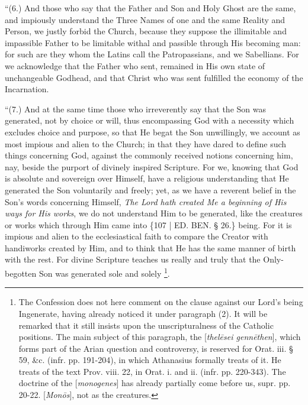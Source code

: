 ``(6.) And those who say that
the Father and Son and Holy Ghost are the same, and impiously
understand the Three Names of one and the same Reality and Person, we
justly forbid the Church, because they suppose the illimitable and
impassible Father to be limitable withal and passible through His
becoming man: for such are they whom the Latins call the Patropassians,
and we Sabellians. For we acknowledge that the Father who sent,
remained in His own state of unchangeable Godhead, and that Christ who
was sent fulfilled the economy of the Incarnation.

``(7.) And at the same time
those who irreverently say that the Son was generated, not by choice
or will, thus encompassing God with a necessity which excludes choice
and purpose, so that He begat the Son unwillingly, we account as most
impious and alien to the Church; in that they have dared to define
such things concerning God, against the commonly received notions
concerning him, nay, beside the purport of divinely inspired
Scripture. For we, knowing that God is absolute and sovereign over
Himself, have a religious understanding that He generated the Son
voluntarily and freely; yet, as we have a reverent belief in the Son's
words concerning Himself, \emph{The Lord hath created Me a beginning of
His ways for His works}, we do not understand Him to be generated,
like the creatures or works which through Him came into \{107 | ED. BEN.
§ 26.\} being. For it is impious and alien to the ecclesiastical faith
to compare the Creator with handiworks created by Him, and to think
that He has the same manner of birth with the rest. For divine
Scripture teaches us really and truly that the Only-begotten Son was
generated sole and solely \footnote{The Confession does not here comment on the clause against our Lord's
being Ingenerate, having already noticed it under paragraph (2). It
will be remarked that it still insists upon the unscripturalness of
the Catholic positions. The main subject of this paragraph, the [\emph{thel\={e}sei
genn\={e}then}], which forms part of the Arian question and
controversy, is reserved for Orat. iii. § 59, \&c. (infr. pp.
191-204), in which Athanasius formally treats of it. He treats of the
text Prov. viii. 22, in Orat. i. and ii. (infr. pp. 220-343). The
doctrine of the [\emph{monogenes}] has already partially come before
us, supr. pp. 20-22. [\emph{Mon\={o}s}], not as the creatures.}.


